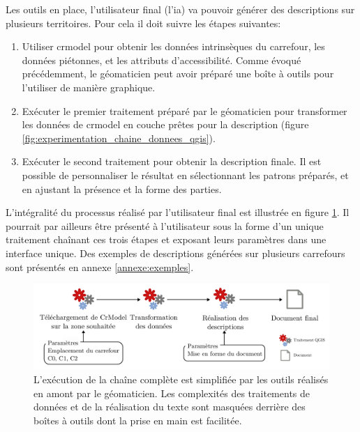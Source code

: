 Les outils en place, l'utilisateur final (l'\gls{ia}) va pouvoir générer des descriptions sur plusieurs territoires. Pour cela il doit suivre les étapes suivantes:

\begin{enumerate}
    \item Utiliser crmodel pour obtenir les données intrinsèques du carrefour, les données piétonnes, et les attributs d'accessibilité. Comme évoqué précédemment, le géomaticien peut avoir préparé une boîte à outils pour l'utiliser de manière graphique.
    \item Exécuter le premier traitement préparé par le géomaticien pour transformer les données  de crmodel en couche prêtes pour la description (figure \ref{fig:experimentation_chaine_donnees_qgis}).
    \item Exécuter le second traitement pour obtenir la description finale. Il est possible de personnaliser le résultat en sélectionnant les patrons préparés, et en ajustant la présence et la forme des parties. 
\end{enumerate}

L'intégralité du processus réalisé par l'utilisateur final est illustrée en figure \ref{fig:experimentation_processus_realisation_utilisateur}. Il pourrait par ailleurs être présenté à l'utilisateur sous la forme d'un unique traitement chaînant ces trois étapes et exposant leurs paramètres dans une interface unique. Des exemples de descriptions générées sur plusieurs carrefours sont présentés en annexe \ref{annexe:exemples}.

\begin{figure}[ht]
    \centering
    \includegraphics[width=\textwidth]{images/experimentation/pipeline_utilisateur.pdf}
    \caption[Étapes d'exécution de la chaîne de description par l'utilisateur]{L'exécution de la chaîne complète est simplifiée par les outils réalisés en amont par le géomaticien. Les complexités des traitements de données et de la réalisation du texte sont masquées derrière des boîtes à outils dont la prise en main est facilitée.}
    \label{fig:experimentation_processus_realisation_utilisateur}
\end{figure}


